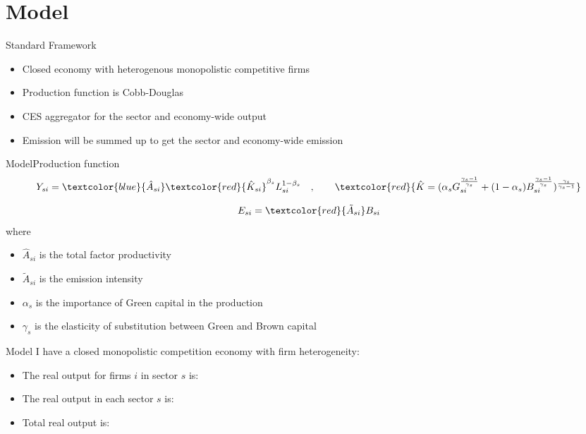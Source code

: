 \documentclass[aspectratio=169]{beamer}
\begin{document}
\section{Model}

\begin{frame}{Standard Framework}{\cite{hsieh2009misallocation}}
	\begin{itemize}
		\item Closed economy with heterogenous monopolistic competitive firms
		\item Production function is Cobb-Douglas 
		\item CES aggregator for the sector and economy-wide output
		\item Emission will be summed up to get the sector and economy-wide emission
	\end{itemize}
\end{frame}
\begin{frame}{Model}{Production function}
	\begin{equation}
		Y_{si} = \textcolor{blue}{\hat{A}_{si}}\textcolor{red}{\hat{K}_{si}}^{\beta_s} L_{si}^{1-\beta_s} \quad,\qquad \textcolor{red}{\hat{K} = (
			\alpha_s G_{si}^{\frac{\gamma_s-1}{\gamma_s}} + (1-\alpha_s) B_{si}^{\frac{\gamma_s-1}{\gamma_s}}
		) ^ {\frac{\gamma_s}{\gamma_s-1}}}
	\end{equation}

	\begin{equation}
		E_{si} = \textcolor{red}{\tilde{A}_{si}} B_{si}
	\end{equation}
	where 
	\begin{itemize}
		\item $\hat{A}_{si}$ is the total factor productivity
		\item $\tilde{A}_{si}$ is the emission intensity
		\item  $\alpha_s$ is the importance of Green capital in the production
		\item $\gamma_s$ is the elasticity of substitution between Green and Brown capital
	\end{itemize}
\end{frame}



\begin{frame}{Model}
	I have a closed monopolistic competition economy with firm heterogeneity:
	\begin{itemize}
		\item The real output for firms $i$ in sector $s$ is:
		 
			\pause
		\item The real output in each sector $s$ is:
			
		\item Total real output is:
				
	\end{itemize}
\end{frame}
\end{document}
